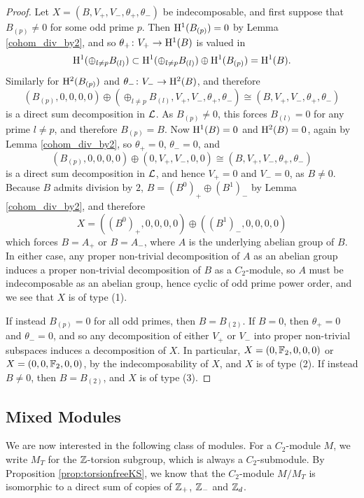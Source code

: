 \begin{proof}
  Let $X = (B, V_+, V_-, {\theta_+},{\theta_-})$ be indecomposable, and first suppose that $B_{(p)} \neq 0$ for some odd prime $p$. Then $\mathrm{H}^1(B_{(p)}) = 0$ by Lemma \ref{cohom_div_by2}, and so $\theta_+ \colon V_+ \rightarrow \mathrm{H}^1(B)$ is valued in 
  \[
  \mathrm{H}^1(\oplus_{l \neq p} B_{(l)}) \subset \mathrm{H}^1(\oplus_{l \neq p} B_{(l)}) \oplus \mathrm{H}^1(B_{(p)}) = \mathrm{H}^1(B).
  \]
  Similarly for $\mathrm{H}^2(B_{(p)})$ and $\theta_- \colon V_- \rightarrow \mathrm{H}^2(B)$, and therefore 
  \[
    (B_{(p)}, 0, 0, 0, 0) \oplus (\oplus_{l \neq p} B_{(l)}, V_+, V_-, \theta_+, \theta_-) \cong (B, V_+, V_-, {\theta_+},{\theta_-})
  \]
  is a direct sum decomposition in ${\mathcal L}$. As $B_{(p)} \neq 0$, this forces $B_{(l)} = 0$ for any prime $l \neq p$, and therefore $B_{(p)} = B$. Now $\mathrm{H}^1(B) = 0$ and $\mathrm{H}^2(B) = 0$, again by Lemma \ref{cohom_div_by2}, so $\theta_+ = 0$, $\theta_- = 0$, and
  \[
  (B_{(p)}, 0, 0, 0, 0) \oplus (0, V_+, V_-, 0, 0) \cong (B, V_+, V_-, {\theta_+},{\theta_-})
  \]
  is a direct sum decomposition in ${\mathcal L}$, and hence $V_+ = 0$ and $V_- = 0$, as $B \neq 0$. Because $B$ admits division by $2$, $B = (B^0)_+ \oplus (B^1)_-$ by Lemma \ref{cohom_div_by2}, and therefore 
  \[
  X = ((B^0)_+,0,0,0,0) \oplus ((B^1)_-,0,0,0,0)
  \]
  which forces $B = A_+$ or $B = A_-$, where $A$ is the underlying abelian group of $B$. In either case, any proper non-trivial decomposition of $A$ as an abelian group induces a proper non-trivial decomposition of $B$ as a $C_2$-module, so $A$ must be indecomposable as an abelian group, hence cyclic of odd prime power order, and we see that $X$ is of type (1).
  
  If instead $B_{(p)} = 0$ for all odd primes, then $B = B_{(2)}$. If $B=0$, then $\theta_+ = 0$ and $\theta_- = 0$, and so any decomposition of either $V_+$ or $V_-$ into proper non-trivial subspaces induces a decomposition of $X$. In particular, $X = (0,{\mathbb F}_2,0,0,0)$ or $X = (0, 0, {\mathbb F}_2,0,0)$, by the indecomposability of $X$, and $X$ is of type (2). If instead $B \neq 0$, then $B = B_{(2)}$, and $X$ is of type (3). 
\end{proof}

\subsection{Mixed Modules}

We are now interested in the following class of modules. For a $C_2$-module $M$, we write $M_T$ for the ${\mathbb Z}$-torsion subgroup, which is always a $C_2$-submodule. By Proposition \ref{prop:torsionfreeKS}, we know that the $C_2$-module $M / M_T$ is isomorphic to a direct sum of copies of ${\mathbb Z}_+$, ${\mathbb Z}_-$ and ${\mathbb Z}_d$.

